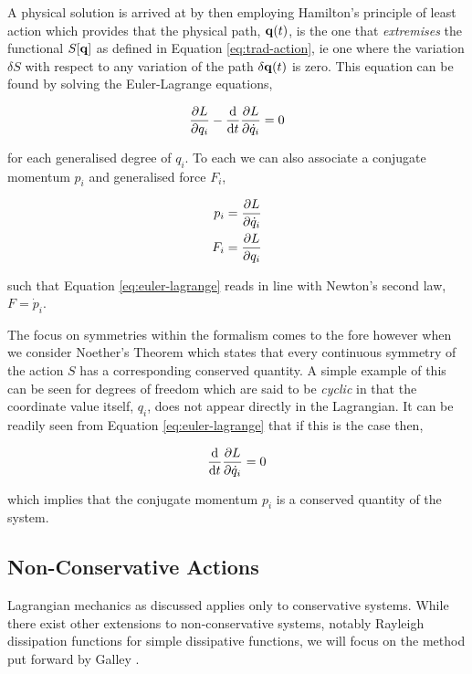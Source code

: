 A physical solution is arrived at by then employing Hamilton's principle of least action \cite{goldsteinClassicalMechanics2000} which provides that the physical path, $\vb q(t)$, is the one that \textit{extremises} the functional $S[\vb q]$ as defined in Equation \eqref{eq:trad-action}, ie one where the variation $\delta S$ with respect to any variation of the path $\delta \vb{q}(t)$ is zero. This equation can be found by solving the Euler-Lagrange equations,

\begin{equation}
	\label{eq:euler-lagrange}
	\frac{\partial L}{\partial q_i} - \frac{\dd}{\dd t}\frac{\partial L}{\partial \dot q_i} = 0
\end{equation}

for each generalised degree of $q_i$. To each we can also associate a conjugate momentum $p_i$ and generalised force $F_i$,

\begin{align}
  p_i = \frac{\partial L }{\partial \dot q_i} \\
  F_i = \frac{\partial L}{\partial q_i}
\end{align}

such that Equation \eqref{eq:euler-lagrange} reads in line with Newton's second law, $F = \dot{p}_i$.

The focus on symmetries within the formalism comes to the fore however when we consider Noether's Theorem \cite{noetherInvariantVariationProblems1971} which states that every continuous symmetry of the action $S$ has a corresponding conserved quantity. A simple example of this can be seen for degrees of freedom which are said to be \emph{cyclic} in that the coordinate value itself, $q_i$, does not appear directly in the Lagrangian. It can be readily seen from Equation \eqref{eq:euler-lagrange} that if this is the case then,

\begin{equation}
  \frac{\dd}{\dd t}\frac{\partial L}{\partial \dot q_i} = 0
\end{equation}

which implies that the conjugate momentum $p_i$ is a conserved quantity of the system.

\subsection{Non-Conservative Actions}
\label{sec:intro-nc-actions}

Lagrangian mechanics as discussed applies only to conservative systems. While there exist other extensions to non-conservative systems, notably Rayleigh dissipation functions \cite{struttGeneralTheoremsRelating1871} for simple dissipative functions, we will focus on the method put forward by Galley \etall \cite{galleyClassicalMechanicsNonconservative2013}.

